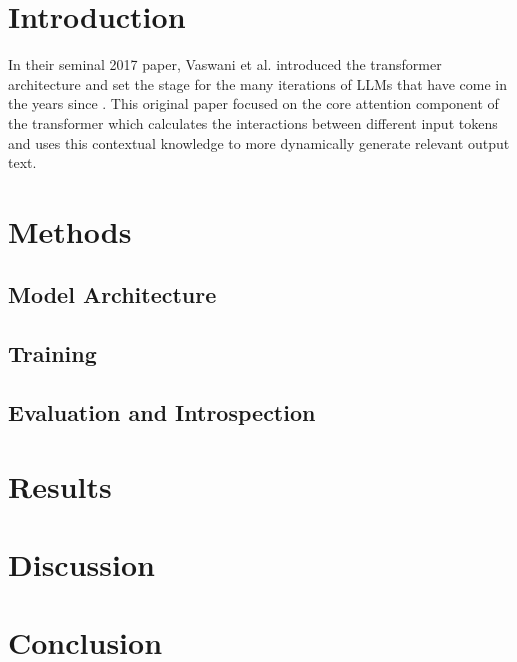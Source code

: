 \documentclass[conference]{IEEEtran}
\begin{document}
\section{Introduction}
In their seminal 2017 paper, Vaswani et al. introduced the 
transformer architecture and set the stage for the many iterations of LLMs that 
have come in the years since \cite{vaswani2023attentionneed}. This original paper focused on the core attention 
component of the transformer which calculates the interactions between different
input tokens and uses this contextual knowledge to more dynamically generate 
relevant output text. 

\section{Methods}
\subsection{Model Architecture}
\subsection{Training}
\subsection{Evaluation and Introspection}

\section{Results}

\section{Discussion}

\section{Conclusion}

\break{}

\end{document}
